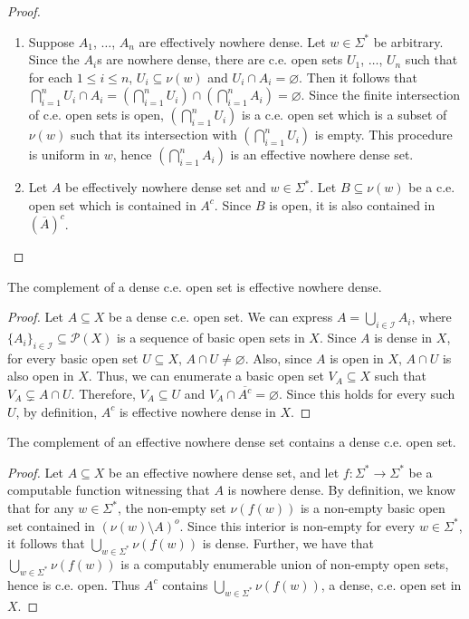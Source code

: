 \documentclass[a4paper,UKenglish,autoref,thm-restate,numberwithinsect]{lipics-v2021}
\begin{document}
\begin{proof}
	\begin{enumerate}
		\item Suppose $A_1$, $\dots$, $A_n$ are effectively nowhere dense. Let $w \in \Sigma^*$ be arbitrary. Since the $A_i$s are nowhere dense, there are c.e. open sets $U_1$, $\dots$, $U_n$ such that for each $1 \le i \le n$, $U_i \subseteq \nu(w)$ and $U_i \cap A_i = \varnothing$. Then it follows that $\bigcap_{i=1}^n U_i \cap A_i = \left(\bigcap_{i=1}^n U_i\right)\cap \left(\bigcap_{i=1}^n A_i\right) = \varnothing$. Since the finite intersection of c.e. open sets is open, $\left(\bigcap_{i=1}^n U_i\right)$ is a c.e. open set which is a subset of $\nu(w)$ such that its intersection with $\left(\bigcap_{i=1}^n U_i\right)$ is empty. This procedure is uniform in $w$, hence $\left(\bigcap_{i=1}^n A_i\right)$ is an effective nowhere dense set. 
		\item Let $A$ be effectively nowhere dense set and $w\in\Sigma^*$. Let $B \subseteq \nu(w)$ be a c.e. open set which is contained in $A^c$. Since $B$ is open, it is also contained in $(\overline{A})^c$. 
	\end{enumerate}
\end{proof}

\begin{lemma}\label{lem:cedensecomp}
	The complement of a dense c.e. open set is effective nowhere dense. 
\end{lemma}
\begin{proof}
	Let $A\subseteq X$ be a dense c.e. open set. We can express $A=\bigcup_{i\in\mathcal{I}}A_i$, where $\{A_i\}_{i\in\mathcal{I}}\subseteq\mathcal{P}(X)$ is a sequence of basic open sets in $X$. Since $A$ is dense in $X$, for every basic open set $U\subseteq X$, $A\cap U\ne\varnothing$. Also, since $A$ is open in $X$, $A\cap U$ is also open in $X$. Thus, we can enumerate a basic open set $V_A\subseteq X$ such that $V_A\subsetneq A\cap U$.	Therefore, $V_A\subseteq U$ and $V_A\cap\overline{A^c}=\varnothing$. Since	this holds for every such $U$, by definition, $A^c$ is effective	nowhere dense in $X$. 
\end{proof}

\begin{lemma}\label{lem:nowhere_dense_complement}
	The complement of an effective nowhere dense set contains a dense c.e.  open set. 
\end{lemma}
\begin{proof}
	Let $A\subseteq X$ be an effective nowhere dense set, and let $f:\Sigma^* \to \Sigma^*$ be a computable function witnessing that $A$ is nowhere dense. By definition, we know that for any $w \in \Sigma^*$, the non-empty set $\nu(f(w))$ is a non-empty basic open set contained in $(\nu(w)\setminus A)^o$. Since this interior is non-empty for every $w \in \Sigma^*$, it follows that $\bigcup_{w \in \Sigma^*} \nu(f(w))$ is dense. Further, we have	that $\bigcup_{w \in \Sigma^*} \nu(f(w))$ is a computably enumerable union of non-empty open sets, hence is c.e. open. Thus $A^c$ contains $\bigcup_{w \in \Sigma^*} \nu(f(w))$, a dense, c.e. open set in $X$. 
\end{proof}
\end{document}
